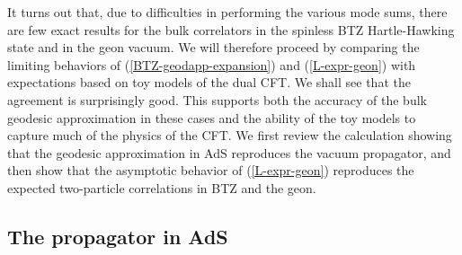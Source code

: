 \documentclass[a4paper,12pt]{article}
\begin{document}
It turns out that, due to difficulties in performing the various mode
sums, there are few exact results for the bulk correlators in the
spinless BTZ Hartle-Hawking state and in the geon vacuum.  We will
therefore proceed by comparing the limiting behaviors of
(\ref{BTZ-geodapp-expansion}) and (\ref{L-expr-geon}) with
expectations based on toy models of the dual CFT.  We shall see that
the agreement is surprisingly good.  This supports both the accuracy
of the bulk geodesic approximation in these cases and the ability of
the toy models to capture much of the physics of the CFT.  We first
review the calculation showing that the geodesic approximation in
AdS\coordHE{} reproduces the vacuum propagator, and then show that the
asymptotic behavior of (\ref{L-expr-geon}) reproduces the expected
two-particle correlations in BTZ and the geon.

\subsection{The propagator in AdS\coordHE{}}
\label{limits}
\end{document}
